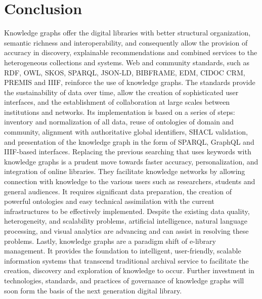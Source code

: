 \documentclass[12pt,a4paper]{article}
\begin{document}
\section{Conclusion}
Knowledge graphs offer the digital libraries with better structural organization, semantic richness and interoperability, and consequently allow the provision of accuracy in discovery, explainable recommendations and combined services to the heterogeneous collections and systems. Web and community standards, such as RDF, OWL, SKOS, SPARQL, JSON-LD, BIBFRAME, EDM, CIDOC CRM, PREMIS and IIIF, reinforce the use of knowledge graphs. The standards provide the sustainability of data over time, allow the creation of sophisticated user interfaces, and the establishment of collaboration at large scales between institutions and networks. Its implementation is based on a series of steps: inventory and normalization of all data, reuse of ontologies of domain and community, alignment with authoritative global identifiers, SHACL validation, and presentation of the knowledge graph in the form of SPARQL, GraphQL and IIIF-based interfaces. Replacing the previous searching that uses keywords with knowledge graphs is a prudent move towards faster accuracy, personalization, and integration of online libraries. They facilitate knowledge networks by allowing connection with knowledge to the various users such as researchers, students and general audiences. It requires significant data preparation, the creation of powerful ontologies and easy technical assimilation with the current infrastructures to be effectively implemented. Despite the existing data quality, heterogeneity, and scalability problems, artificial intelligence, natural language processing, and visual analytics are advancing and can assist in resolving these problems. Lastly, knowledge graphs are a paradigm shift of e-library management. It provides the foundation to intelligent, user-friendly, scalable information systems that transcend traditional archival service to facilitate the creation, discovery and exploration of knowledge to occur. Further investment in technologies, standards, and practices of governance of knowledge graphs will soon form the basis of the next generation digital library.
\end{document}
